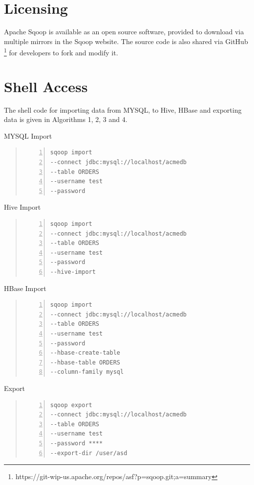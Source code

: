 \documentclass[9pt,twocolumn,twoside]{styles/osajnl}
\begin{document}
\section{Licensing}
Apache Sqoop is available as an open source software, provided to download via multiple mirrors in the Sqoop website\cite{down}. The source code is also shared via GitHub \footnote{https://git-wip-us.apache.org/repos/asf?p=sqoop.git;a=summary} for developers to fork and modify it. 

\section{Shell Access}
The shell code for importing data from MYSQL, to Hive, HBase and exporting data is given in Algorithms 1, 2, 3 and 4\cite{cloudera}.

\begin{algorithm}
\caption{MYSQL Import}\label{alg:mysql}
\begin{quote}
\begin{Verbatim}[numbers=left]
sqoop import 
--connect jdbc:mysql://localhost/acmedb 
--table ORDERS 
--username test 
--password 
\end{Verbatim}
\end{quote}
\end{algorithm}
\begin{algorithm}
\caption{Hive Import}\label{alg:hive}
\begin{quote}
\begin{Verbatim}[numbers=left]
sqoop import 
--connect jdbc:mysql://localhost/acmedb 
--table ORDERS 
--username test 
--password
--hive-import
\end{Verbatim}
\end{quote}
\end{algorithm}
\begin{algorithm}
\caption{HBase Import}\label{alg:hbase}
\begin{quote}
\begin{Verbatim}[numbers=left]
sqoop import 
--connect jdbc:mysql://localhost/acmedb
--table ORDERS 
--username test 
--password 
--hbase-create-table 
--hbase-table ORDERS 
--column-family mysql
\end{Verbatim}
\end{quote}
\end{algorithm}

\begin{algorithm}
\caption{Export}\label{alg:export}
\begin{quote}
\begin{Verbatim}[numbers=left]
sqoop export
--connect jdbc:mysql://localhost/acmedb
--table ORDERS 
--username test 
--password **** 
--export-dir /user/asd
\end{Verbatim}
\end{quote}
\end{algorithm}
\end{document}
